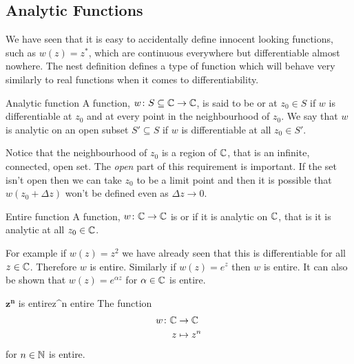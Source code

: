 \documentclass{article}
\begin{document}
    \subsection{Analytic Functions}
    We have seen that it is easy to accidentally define innocent looking functions, such as \(w(z) = z^*\), which are continuous everywhere but differentiable almost nowhere.
    The nest definition defines a type of function which will behave very similarly to real functions when it comes to differentiability.
    \begin{definition}{Analytic function}{}
        A function, \(w\colon S\subseteq\mathbb{C}\to\mathbb{C}\), is said to be  or  at \(z_0\in S\) if \(w\) is differentiable at \(z_0\) and at every point in the neighbourhood of \(z_0\).
        We say that \(w\) is analytic on an open subset \(S'\subseteq S\) if \(w\) is differentiable at all \(z_0\in S'\).
    \end{definition}
    Notice that the neighbourhood of \(z_0\) is a region of \(\mathbb{C}\), that is an infinite, connected, open set.
    The \emph{open} part of this requirement is important.
    If the set isn't open then we can take \(z_0\) to be a limit point and then it is possible that \(w(z_0 + \Delta z)\) won't be defined even as \(\Delta z \to 0\).
    \begin{definition}{Entire function}{}
        A function, \(w\colon \mathbb{C} \to\mathbb{C}\) is  or  if it is analytic on \(\mathbb{C}\), that is it is analytic at all \(z_0 \in\mathbb{C}\).
    \end{definition}
    For example if \(w(z) = z^2\) we have already seen that this is differentiable for all \(z\in\mathbb{C}\).
    Therefore \(w\) is entire.
    Similarly if \(w(z) = e^z\) then \(w\) is entire.
    It can also be shown that \(w(z) = e^{\alpha z}\) for \(\alpha\in\mathbb{C}\) is entire.
    \begin{lemma}{\(\bm{z^n}\) is entire}{z^n entire}
        The function
        \begin{align*}
            w\colon\mathbb{C}&\to\mathbb{C}\\
            z&\mapsto z^n
        \end{align*}
        for \(n\in\mathbb{N}\) is entire.
    \end{lemma}
\end{document}

